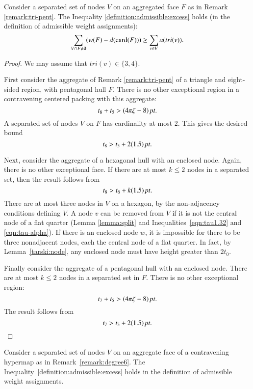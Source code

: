 \begin{lemma}
Consider a separated set of nodes $V$ on an aggregated face $F$ as
in Remark \ref{remark:tri-pent}.  The Inequality
\ref{definition:admissible:excess} holds (in the definition of
admissible weight assignments):
    $$\sum_{V\cap F\ne\emptyset} (w(F) -d({\operatorname{card}}(F)))
            \ge \sum_{v\in V} a(tri(v)).$$
\end{lemma}

\begin{proof}
We may assume that $tri(v)\in\{3,4\}$.

First consider the aggregate of Remark \ref{remark:tri-pent} of a
triangle and eight-sided region, with pentagonal hull $F$. There
is no other exceptional region in a contravening centered packing
with this aggregate:
    $$t_8 + t_5 > (4\pi\zeta-8)\,\hbox{\it pt}.$$
A separated set of nodes $V$ on $F$ has cardinality at most $2$.
This gives the desired bound $$t_8 > t_5 + 2 (1.5)\,\hbox{\it pt}.$$

Next, consider the aggregate of a hexagonal hull with an enclosed
node.  Again, there is no other exceptional face. If there are at
most $k\le 2$ nodes in a separated set, then the result follows from
    $$t_8 > t_6 + k (1.5)\,\hbox{\it pt}.$$
There are at most three nodes in $V$ on a hexagon, by the
non-adjacency conditions defining $V$. A node $v$ can be removed
from $V$ if it is not the central node of a flat quarter (Lemma
\ref{lemma:split} and Inequalities~\ref{eqn:tau1.32} and
\ref{eqn:tau-alpha}). If there is an enclosed node $w$, it is
impossible for there to be three nonadjacent nodes, each the central
node of a flat quarter.  In fact, by Lemma~\ref{tarski:node},
any enclosed node must have height greater than $2t_0$.



Finally consider the aggregate of a pentagonal hull with an enclosed
node.  There are at most $k\le2$ nodes in a separated set in $F$.
There is no other exceptional region:
    $$t_7 + t_5 > (4\pi\zeta-8)\,\hbox{\it pt}.$$
The result follows from
    $$t_7 > t_5 + 2(1.5)\,\hbox{\it pt}.$$
\end{proof}

\begin{lemma}
Consider a separated set of nodes $V$ on an aggregate face of a
contravening hypermap as in Remark~\ref{remark:degree6}.  The
Inequality~\ref{definition:admissible:excess} holds in the
definition of admissible weight assignments.
\end{lemma}

